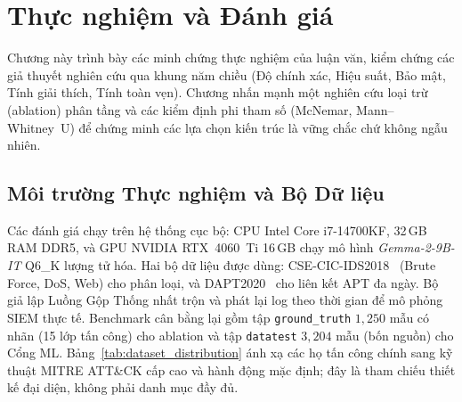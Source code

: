 \chapter{Thực nghiệm và Đánh giá}
\label{ch:experiments_evaluation}

Chương này trình bày các minh chứng thực nghiệm của luận văn, kiểm chứng các giả thuyết nghiên cứu qua khung năm chiều (Độ chính xác, Hiệu suất, Bảo mật, Tính giải thích, Tính toàn vẹn). Chương nhấn mạnh một nghiên cứu loại trừ (ablation) phân tầng và các kiểm định phi tham số (McNemar, Mann--Whitney~U) để chứng minh các lựa chọn kiến trúc là vững chắc chứ không ngẫu nhiên.

\section{Môi trường Thực nghiệm và Bộ Dữ liệu}
Các đánh giá chạy trên hệ thống cục bộ: CPU Intel Core i7-14700KF, 32\,GB RAM DDR5, và GPU NVIDIA RTX~4060~Ti 16\,GB chạy mô hình \textit{Gemma-2-9B-IT} Q6\_K lượng tử hóa. Hai bộ dữ liệu được dùng: CSE-CIC-IDS2018~\cite{ids2018} (Brute Force, DoS, Web) cho phân loại, và DAPT2020~\cite{dapt2020} cho liên kết APT đa ngày. Bộ giả lập Luồng Gộp Thống nhất trộn và phát lại log theo thời gian để mô phỏng SIEM thực tế. Benchmark cân bằng lại gồm tập \texttt{ground\_truth} $1{,}250$ mẫu có nhãn (15 lớp tấn công) cho ablation và tập \texttt{datatest} $3{,}204$ mẫu (bốn nguồn) cho Cổng ML. Bảng~\ref{tab:dataset_distribution} ánh xạ các họ tấn công chính sang kỹ thuật MITRE ATT\&CK cấp cao và hành động mặc định; đây là tham chiếu thiết kế đại diện, không phải danh mục đầy đủ.


